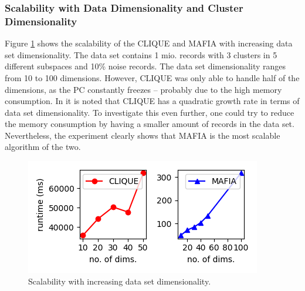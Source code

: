 \subsubsection{Scalability with Data Dimensionality and Cluster Dimensionality}
Figure \ref{fig:data_dimensionality_vs_runtime} shows the scalability of the CLIQUE and MAFIA with increasing data set dimensionality. The data set contains 1 mio. records with 3 clusters in 5 different subspaces and 10\% noise records. The data set dimensionality ranges from 10 to 100 dimensions. However, CLIQUE was only able to handle half of the dimensions, as the PC constantly freezes -- probably due to the high memory consumption. In \cite{clique} it is noted that CLIQUE has a quadratic growth rate in terms of data set dimensionality. To investigate this even further, one could try to reduce the memory consumption by having a smaller amount of records in the data set. Nevertheless, the experiment clearly shows that MAFIA is the most scalable algorithm of the two.
\begin{figure}[H]
    \vspace*{-0.7cm}
    \centering
    \includegraphics[scale=0.45]{figures/data_dimensionality_vs_runtime.png}
    \caption{Scalability with increasing data set dimensionality.}
    \label{fig:data_dimensionality_vs_runtime}
    \vspace*{-0.7cm}
\end{figure}

